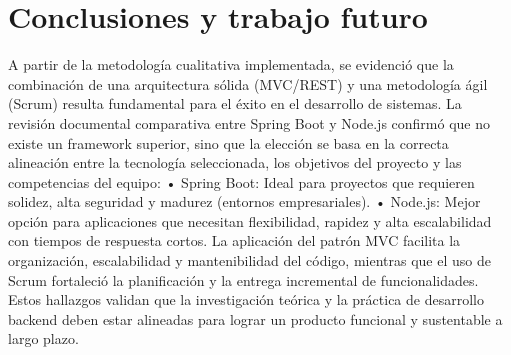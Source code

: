 \section{Conclusiones y trabajo futuro}
A partir de la metodología cualitativa implementada, se evidenció que la combinación de una arquitectura sólida (MVC/REST) y una metodología ágil (Scrum) resulta fundamental para el éxito en el desarrollo de sistemas.
La revisión documental comparativa entre Spring Boot y Node.js confirmó que no existe un framework superior, sino que la elección se basa en la correcta alineación entre la tecnología seleccionada, los objetivos del proyecto y las competencias del equipo:
•	Spring Boot: Ideal para proyectos que requieren solidez, alta seguridad y madurez (entornos empresariales).
•	Node.js: Mejor opción para aplicaciones que necesitan flexibilidad, rapidez y alta escalabilidad con tiempos de respuesta cortos.
La aplicación del patrón MVC facilita la organización, escalabilidad y mantenibilidad del código, mientras que el uso de Scrum fortaleció la planificación y la entrega incremental de funcionalidades. Estos hallazgos validan que la investigación teórica y la práctica de desarrollo backend deben estar alineadas para lograr un producto funcional y sustentable a largo plazo.